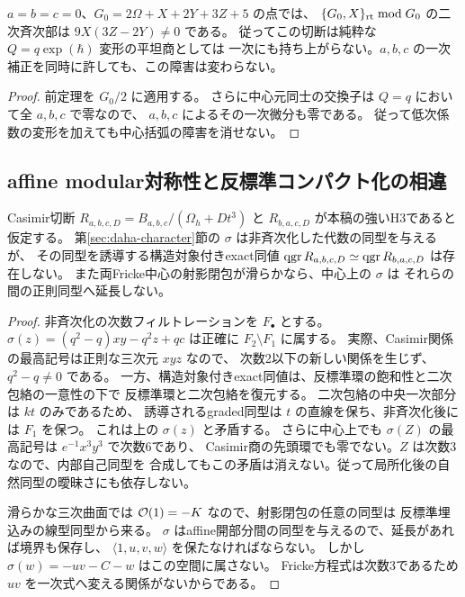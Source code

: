 \begin{corollary}[本稿の選択点における具体的障害]
$a=b=c=0$、$G_0=2\Omega+X+2Y+3Z+5$ の点では、
$\{G_0,X\}_{\rm rt}\bmod G_0$ の二次斉次部は
$9X(3Z-2Y)\ne0$ である。
従ってこの切断は純粋な $Q=q\exp(\hbar)$ 変形の平坦商としては
一次にも持ち上がらない。$a,b,c$ の一次補正を同時に許しても、この障害は変わらない。
\end{corollary}
\begin{proof}
前定理を $G_0/2$ に適用する。
さらに中心元同士の交換子は $Q=q$ において全 $a,b,c$ で零なので、
$a,b,c$ によるその一次微分も零である。
従って低次係数の変形を加えても中心括弧の障害を消せない。
\end{proof}

\subsection{affine modular対称性と反標準コンパクト化の相違}
\begin{proposition}
\label{prop:vieta-not-pointed-heart}
Casimir切断 $R_{a,b,c,D}=B_{a,b,c}/(\Omega_h+Dt^3)$ と
$R_{b,a,c,D}$ が本稿の強いH3であると仮定する。
第\ref{sec:daha-character}節の $\sigma$ は非斉次化した代数の同型を与えるが、
その同型を誘導する構造対象付きexact同値
$\operatorname{qgr} R_{a,b,c,D}\simeq\operatorname{qgr} R_{b,a,c,D}$ は存在しない。
また両Fricke中心の射影閉包が滑らかなら、中心上の $\sigma$ は
それらの間の正則同型へ延長しない。
\end{proposition}
\begin{proof}
非斉次化の次数フィルトレーションを $F_\bullet$ とする。
$\sigma(z)=(q^2-q)xy-q^2z+qc$ は正確に $F_2\setminus F_1$ に属する。
実際、Casimir関係の最高記号は正則な三次元 $xyz$ なので、
次数2以下の新しい関係を生じず、$q^2-q\ne0$ である。
一方、構造対象付きexact同値は、反標準環の飽和性と二次包絡の一意性\cite[反標準環による包絡の一意性]{CompanionE6}の下で
反標準環と二次包絡を復元する。
二次包絡の中央一次部分は $kt$ のみであるため、
誘導されるgraded同型は $t$ の直線を保ち、非斉次化後には $F_1$ を保つ。
これは上の $\sigma(z)$ と矛盾する。
さらに中心上でも $\sigma(Z)$ の最高記号は $e^{-1}x^3y^3$ で次数6であり、
Casimir商の先頭環でも零でない。$Z$ は次数3なので、内部自己同型を
合成してもこの矛盾は消えない。従って局所化後の自然同型の曖昧さにも依存しない。

滑らかな三次曲面では $\mathcal O(1)=-K$ なので、射影閉包の任意の同型は
反標準埋込みの線型同型から来る。
$\sigma$ はaffine開部分間の同型を与えるので、延長があれば境界も保存し、
$\langle1,u,v,w\rangle$ を保たなければならない。
しかし $\sigma(w)=-uv-C-w$ はこの空間に属さない。
Fricke方程式は次数3であるため $uv$ を一次式へ変える関係がないからである。
\end{proof}

